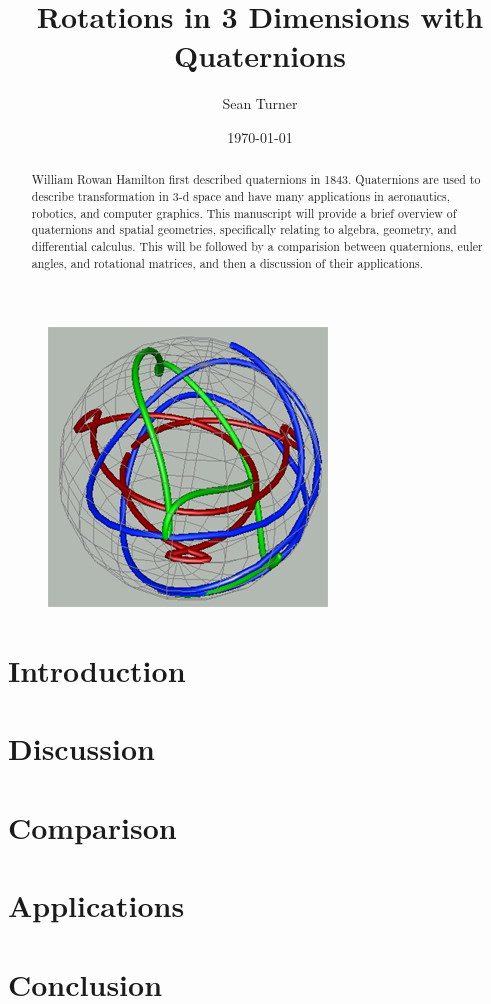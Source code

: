 \documentclass{article}
\theoremstyle{definition}
\begin{document}
\title{Rotations in 3 Dimensions with Quaternions}
\date{\today}
\author{Sean Turner}
\maketitle

\begin{figure}[H]
\centering
\includegraphics[width = .65\textwidth]{Figures/quaternion_map}
\end{figure}

\newpage
{}
\tableofcontents
\listoffigures
\newpage
{}
\begin{abstract}
\noindent William Rowan Hamilton first described quaternions in 1843.
Quaternions are used to describe transformation in 3-d space and have many applications in aeronautics, robotics, and computer graphics.
This manuscript will provide a brief overview of quaternions and spatial geometries, specifically relating to algebra, geometry, and differential calculus.
This will be followed by a comparision between quaternions, euler angles, and rotational matrices, and then a discussion of their applications.
\end{abstract}

\section{Introduction}


\section{Discussion}
\label{sec:disc}


\section{Comparison}
\label{sec:comp}


\section{Applications}
\label{sec:app}


\section{Conclusion}
\label{sec:conc}


\newpage


\end{document}
